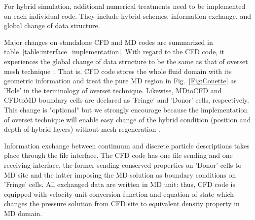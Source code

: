 \documentclass[conference,final]{IEEEtran}
\begin{document}
For hybrid simulation, additional numerical treatments need to be implemented on each individual code. They include hybrid schemes, information exchange, and global change of data structure.

Major changes on standalone CFD and MD codes are summarized in table~\ref{table:interface_implementation}. With regard to the CFD code, it experiences the global change of data structure to be the same as that of overset mesh technique~\cite{Chimera}. That is, CFD code stores the whole fluid domain with its geometric information and treat the pure MD region in Fig.~\ref{Fig:Couette} as 'Hole' in the terminology of overset technique. Likewise, MDtoCFD and CFDtoMD boundary cells are declared as 'Fringe' and 'Donor' cells, respectively. This change is "optional" but we strongly encourage because the implementation of overset technique will enable easy change of the hybrid condition (position and depth of hybrid layers) without mesh regeneration .


Information exchange between continuum and discrete particle descriptions takes place through the file interface. The CFD code has one file sending and one receiving interface, the former sending conserved properties on 'Donor' cells to MD site and the latter imposing the MD solution as boundary conditions on 'Fringe' cells. All exchanged data are written in MD unit: thus, CFD code is equipped with velocity unit conversion function and equation of state which changes the pressure solution from CFD site to equivalent density property in MD domain.


\end{document}
